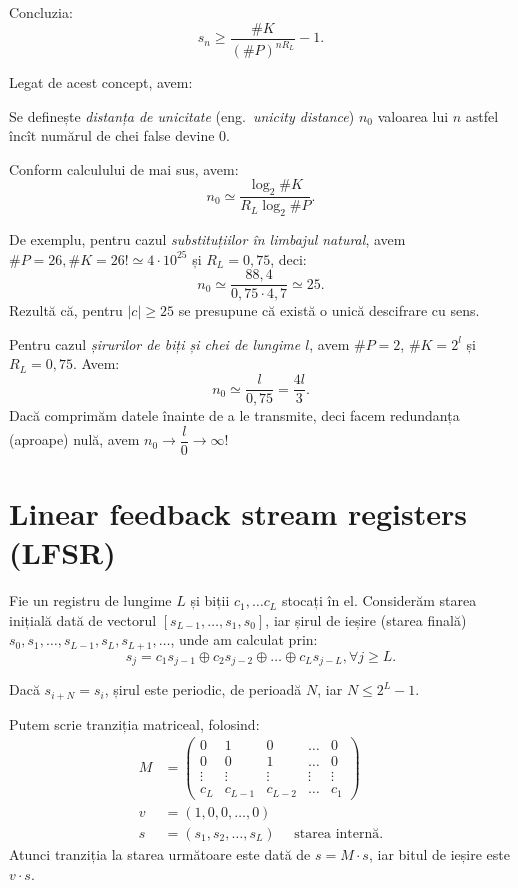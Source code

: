 Concluzia:
\[
  s_n \geq \frac{\# K}{(\#P)^{nR_L}} - 1.
\]

Legat de acest concept, avem:
\begin{definition}\label{def:unicity-dist}
  Se definește \emph{distanța de unicitate} (eng.\ \emph{unicity distance}) $ n_0 $
  valoarea lui $ n $ astfel încît numărul de chei false devine 0.
\end{definition}

Conform calculului de mai sus, avem:
\[
  n_0 \simeq \frac{\log_2 \# K}{R_L \log_2 \# P}.
\]

De exemplu, pentru cazul \emph{substituțiilor în limbajul natural}, avem
$ \# P = 26, \# K = 26! \simeq 4 \cdot 10^{25} $ și $ R_L = 0,75 $, deci:
\[
  n_0 \simeq \frac{88,4}{0,75 \cdot 4,7} \simeq 25.
\]
Rezultă că, pentru $ |c| \geq 25 $ se presupune că există o unică
descifrare cu sens.

\vspace{1cm}

Pentru cazul \emph{șirurilor de biți și chei de lungime $ l $}, avem $ \# P = 2 $,
$ \# K = 2^l $ și $ R_L = 0,75 $. Avem:
\[
  n_0 \simeq \frac{l}{0,75} = \frac{4l}{3}.
\]
Dacă comprimăm datele înainte de a le transmite, deci facem redundanța
(aproape) nulă, avem $ n_0 \to \dfrac{l}{0} \to \infty $!



\section{Linear feedback stream registers (LFSR)}
Fie un registru de lungime $ L $ și biții $ c_1, \dots c_L $ stocați
în el. Considerăm starea inițială dată de vectorul $ [s_{L-1}, \dots, s_1, s_0 ] $,
iar șirul de ieșire (starea finală) $ s_0, s_1, \dots, s_{L-1}, s_L, s_{L+1}, \dots $,
unde am calculat prin:
\[
  s_j = c_1 s_{j-1} \oplus c_2 s_{j-2} \oplus \dots \oplus c_Ls_{j - L}, %
  \forall j \geq L.
\]

Dacă $ s_{i + N} = s_i $, șirul este periodic, de perioadă $ N $, iar $ N \leq 2^L - 1 $.

Putem scrie tranziția matriceal, folosind:
\begin{align*}
  M &= \begin{pmatrix}
    0 & 1 & 0 & \dots & 0 \\
    0 & 0 & 1 & \dots & 0 \\
    \vdots & \vdots & \vdots & \vdots & \vdots \\
    c_L & c_{L-1} & c_{L-2} & \dots & c_1
  \end{pmatrix} \\
  v &= (1, 0, 0, \dots, 0) \\
  s &= (s_1, s_2, \dots, s_L) \quad \text{ starea internă}.
\end{align*}
Atunci tranziția la starea următoare este dată de $ s = M\cdot s $, iar
bitul de ieșire este $ v \cdot s $.

